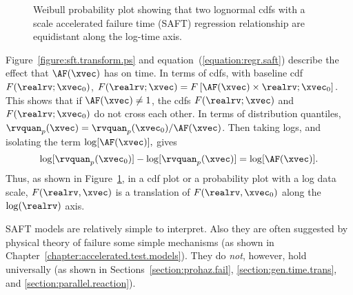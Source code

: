 \begin{figure}
\caption{Weibull probability plot showing that two lognormal 
cdfs with a scale accelerated failure time (SAFT) regression
relationship are equidistant along the log-time axis.}
\label{figure:lawless.lognor.aft.ps}
\end{figure}
Figure~\ref{figure:sft.transform.ps} and 
equation~(\ref{equation:regr.saft})
describe the effect that $\AF(\xvec)$ has on time. In
terms of cdfs, with baseline cdf $F(\realrv;\xvec_{0})$, $F(\realrv;
\xvec)=F \left [
\AF(\xvec) \times \realrv ; \xvec_{0} \right ].$ This shows that 
if $\AF(\xvec) \ne 1$, the cdfs $F(\realrv; \xvec)$ and
$F(\realrv;\xvec_{0})$ do not cross each other. In terms of
distribution quantiles,
$\rvquan_{p}(\xvec)=\rvquan_{p}(\xvec_{0})/\AF(\xvec)$.  Then taking
logs, and isolating the term $\log[\AF(\xvec)],$ gives
\begin{equation}
\label{equation:log.saft}
\log[\rvquan_{p}(\xvec_{0})]
 - \log[\rvquan_{p}(\xvec)]=\log[\AF(\xvec)].
\end{equation}
Thus, as shown in Figure~\ref{figure:lawless.lognor.aft.ps}, in a cdf
plot or a probability plot with a log data scale, $F(\realrv, \xvec)$
is a translation of $F(\realrv, \xvec_{0})$ along the $\log(\realrv)$
axis.

SAFT models are relatively simple to interpret.  Also they are often
suggested by physical theory of failure some simple mechanisms (as
shown in Chapter~\ref{chapter:accelerated.test.models}). They do
{\em not}, however, hold universally (as shown in
Sections~\ref{section:prohaz.fail}, \ref{section:gen.time.trans},
and \ref{section:parallel.reaction}).

